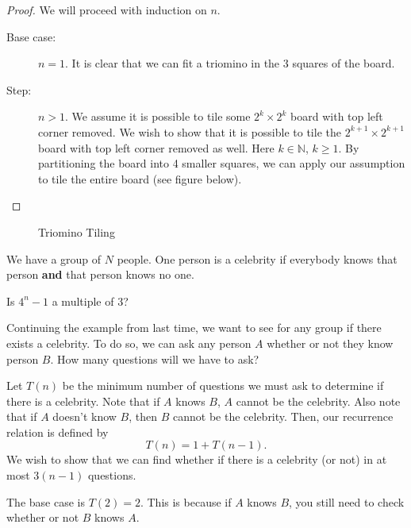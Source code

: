 \documentclass[a4paper]{article}
\begin{document}
\begin{proof}
	We will proceed with induction on \( n \).
	\begin{description}
		\item[Base case:] \( n = 1 \). It is clear that we can fit a triomino in the 3 squares of the board.	
		\item[Step:] \( n > 1 \). We assume it is possible to tile some \( 2^k \times 2^k \) board with top left corner removed. We wish to show that it is possible to tile the \( 2^{k+1} \times 2^{k+1}   \) board with top left corner removed as well. Here \( k \in \mathbb{N} \), \( k \ge 1 \). By partitioning the board into 4 smaller squares, we can apply our assumption to tile the entire board (see figure below).
	\end{description}
\end{proof}

\begin{figure}[H]
    \centering
    \caption{Triomino Tiling}
    \label{fig:triomino-tiling}
\end{figure}

\begin{eg}
	We have a group of  \( N \) people. One person is a celebrity if everybody knows that person \textbf{and} that person knows no one.
\end{eg}

Is \( 4^n - 1 \) a multiple of 3?


Continuing the example from last time, we want to see for any group if there exists a celebrity. To do so, we can ask any person \( A \) whether or not they know person \( B \). How many questions will we have to ask?

Let \( T(n) \) be the minimum number of questions we must ask to determine if there is a celebrity. Note that if \( A \) knows \( B \), \( A \) cannot be the celebrity. Also note that if \( A \) doesn't know \( B \), then \( B \) cannot be the celebrity. Then, our recurrence relation is defined by \[
	T(n) = 1 + T(n-1)
.\] We wish to show that we can find whether if there is a celebrity (or not) in at most \( 3(n-1) \) questions.

\begin{note}
	The base case is \( T(2) = 2 \). This is because if \( A \) knows \( B \), you still need to check whether or not \( B \) knows \( A \).
\end{note}
\end{document}
